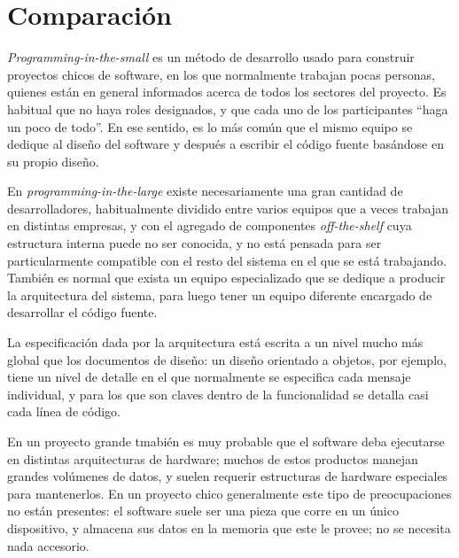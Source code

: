 
\section{Comparación}


\textit{Programming-in-the-small} es un método de desarrollo usado para construir proyectos chicos de software, en los que normalmente trabajan pocas personas, quienes están en general informados acerca de todos los sectores del proyecto. Es habitual que no haya roles designados, y que cada uno de los participantes ``haga un poco de todo''. En ese sentido, es lo más común que el mismo equipo se dedique al diseño del software y después a escribir el código fuente basándose en su propio diseño.

En \textit{programming-in-the-large} existe necesariamente una gran cantidad de desarrolladores, habitualmente dividido entre varios equipos que a veces trabajan en distintas empresas, y con el agregado de componentes \textit{off-the-shelf} cuya estructura interna puede no ser conocida, y no está pensada para ser particularmente compatible con el resto del sistema  en el que se está trabajando. También es normal que exista un equipo especializado que se dedique a producir la arquitectura del sistema, para luego tener un equipo diferente encargado de desarrollar el código fuente. 

La especificación dada por la arquitectura está escrita a un nivel mucho más global que los documentos de diseño: un diseño orientado a objetos, por ejemplo, tiene un nivel de detalle en el que normalmente se especifica cada mensaje individual, y para los que son claves dentro de la funcionalidad se detalla casi cada línea de código.

En un proyecto grande tmabién es muy probable que el software deba ejecutarse en distintas arquitecturas de hardware; muchos de estos productos manejan grandes volúmenes de datos, y suelen requerir estructuras de hardware especiales para mantenerlos. En un proyecto chico generalmente este tipo de preocupaciones no están presentes: el software suele ser una pieza que corre en un único dispositivo, y almacena sus datos en la memoria que este le provee; no se necesita nada accesorio.

